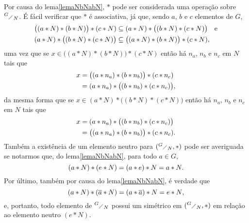 \begin{dem}
  Por causa do lema\xspace\ref{lemaNbNabN}, $\ast$ pode ser considerada
  uma operação sobre $^{G}{\scriptstyle\diagup}_{{N}}$. É fácil verificar que $\ast$ é
  associativa, já que, sendo $a$, $b$ e $c$ elementos de $G$,
  \begin{equation*}
    \begin{aligned}
      \bigl((a\ast N)\ast(b\ast N)\bigr)\ast (c\ast N)
      &\subseteq (a\ast N)\ast\bigl((b\ast N)\ast(c\ast N)\bigr)
      \quad\text{e}\\
      (a\ast N)\ast\bigl((b\ast N)\ast(c\ast N)\bigr) &\subseteq
      \bigl((a\ast N)\ast(b\ast N)\bigr)\ast (c\ast N)\mathrm{,}
    \end{aligned}
  \end{equation*}
  uma vez que se $x\in\bigl((a\ast N)\ast(b\ast N)\bigr)\ast(c\ast N)$
  então há $n_a$, $n_b$
  e $n_c$ em
  $N$ tais que
  \begin{equation*}
    \begin{aligned}
      x &= \bigl((a\ast n_a)\ast (b\ast n_b)\bigr)\ast (c\ast n_c)\\
        &= (a\ast n_a)\ast \bigl((b\ast n_b)\ast (c\ast n_c)\bigr)\mathrm{,}
    \end{aligned}
  \end{equation*}
  da mesma forma que se
  $x\in(a\ast N)\ast\bigl((b\ast N)\ast(c\ast N)\bigr)$
  então há $n_a$, $n_b$
  e $n_c$ em
  $N$ tais que
  \begin{equation*}
    \begin{aligned}
      x &= (a\ast n_a)\ast \bigl((b\ast n_b)\ast (c\ast n_c)\bigr)\\
        &= \bigl((a\ast n_a)\ast (b\ast n_b)\bigr)\ast (c\ast n_c)\mathrm{.}
    \end{aligned}
  \end{equation*}
  Também a existência de um elemento neutro para $(^{G}{\scriptstyle\diagup}_{{N}},\ast)$
  pode ser averiguada se notarmos que, do lema\xspace\ref{lemaNbNabN},
  para todo $a\in G$,
  \begin{equation*}
    (a\ast N)\ast(e\ast N) = (a\ast e)\ast N = a\ast N\mathrm{.}
  \end{equation*}
  Por último, também por causa do lema\xspace\ref{lemaNbNabN}, é verdade
  que
  \begin{equation*}
    (a\ast N)\ast(\overline{a}\ast N) =
    (a\ast \overline{a})\ast N =
    e\ast N\mathrm{,}
  \end{equation*}
  e, portanto, todo elemento de $^{G}{\scriptstyle\diagup}_{{N}}$ possui um simétrico em
  $(^{G}{\scriptstyle\diagup}_{{N}},\ast)$ em relação ao elemento neutro $(e\ast N)$.
\end{dem}

